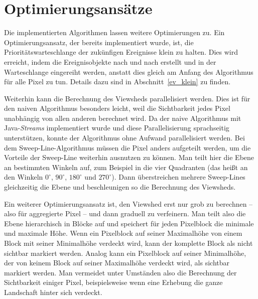 \section{Optimierungsansätze}
\label{opt_an}
Die implementierten Algorithmen lassen weitere Optimierungen zu.
Ein Optimierungsansatz, der bereits implementiert wurde, ist, die Prioritätswarteschlange der zukünfigen Ereignisse klein zu halten.
Dies wird erreicht, indem die Ereignisobjekte nach und nach erstellt und in der Warteschlange eingereiht werden,
anstatt dies gleich am Anfang des Algorithmus für alle Pixel zu tun.
Details dazu sind in Abschnitt~\ref{ev_klein} zu finden.

Weiterhin kann die Berechnung des Viewsheds parallelisiert werden.
Dies ist für den naiven Algorithmus besonders leicht, weil die Sichtbarkeit jedes Pixel unabhängig von allen anderen berechnet wird.
Da der naive Algorithmus mit Java-\emph{Streams} implementiert wurde und diese Parallelisierung sprachseitig unterstützen,
konnte der Algorithmus ohne Aufwand parallelisiert werden.
Bei dem Sweep-Line-Algorithmus müssen die Pixel anders aufgeteilt werden, um die Vorteile der Sweep-Line weiterhin ausnutzen zu können.
Man teilt hier die Ebene an bestimmten Winkeln auf, zum Beispiel in die vier Quadranten (das heißt an den Winkeln $0^\circ$, $90^\circ$, $180^\circ$ und $270^\circ$).
Dann überstreichen mehrere Sweep-Lines gleichzeitig die Ebene und beschleunigen so die Berechnung des Viewsheds.

Ein weiterer Optimierungsansatz ist, den Viewshed erst nur grob zu berechnen -- also für aggregierte Pixel -- und dann graduell zu verfeinern.
Man teilt also die Ebene hierarchisch in Blöcke auf und speichert für jeden Pixelblock die minimale und maximale Höhe.
Wenn ein Pixelblock auf seiner Maximalhöhe von einem Block mit seiner Minimalhöhe verdeckt wird, kann der komplette Block als nicht sichtbar markiert werden.
Analog kann ein Pixelblock auf seiner Minimalhöhe, der von keinem Block auf seiner Maximalhöhe verdeckt wird, als sichtbar markiert werden.
Man vermeidet unter Umständen also die Berechnung der Sichtbarkeit einiger Pixel, beispielsweise wenn eine Erhebung die ganze Landschaft hinter sich verdeckt.
